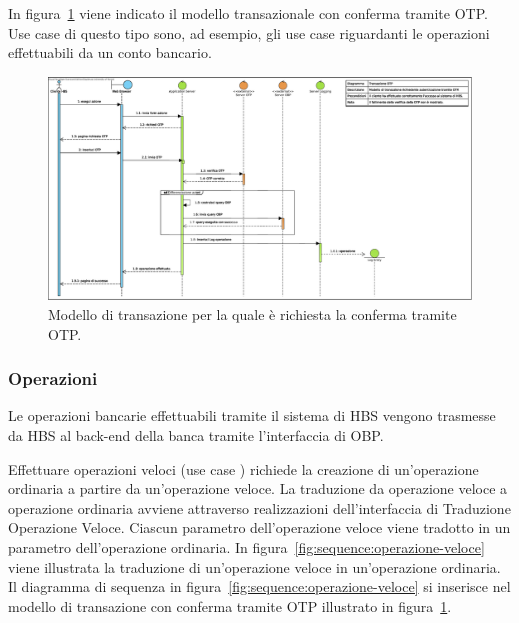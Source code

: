 In figura~\ref{fig:sequence:transazione-otp:modello} viene indicato il modello transazionale con conferma tramite OTP.
Use case di questo tipo sono, ad esempio, gli use case riguardanti le operazioni effettuabili da un conto bancario.

\begin{figure}[h]
	\centering
	\includegraphics[width=\textheight, angle=90]{Images/sequence/Transazione_OTP.eps}
	\caption{Modello di transazione per la quale è richiesta la conferma tramite OTP.}
	\label{fig:sequence:transazione-otp:modello}
\end{figure}

\subsubsection{Operazioni}

Le operazioni bancarie effettuabili tramite il sistema di HBS vengono trasmesse da HBS al back-end della banca tramite l'interfaccia di OBP.

Effettuare operazioni veloci (use case \iducDISOPVEL) richiede la creazione di un'operazione ordinaria a partire da un'operazione veloce.
La traduzione da operazione veloce a operazione ordinaria avviene attraverso realizzazioni dell'interfaccia di Traduzione Operazione Veloce.
Ciascun parametro dell'operazione veloce viene tradotto in un parametro dell'operazione ordinaria.
In figura~\ref{fig:sequence:operazione-veloce} viene illustrata la traduzione di un'operazione veloce in un'operazione ordinaria.
Il diagramma di sequenza in figura~\ref{fig:sequence:operazione-veloce} si inserisce nel modello di transazione con conferma tramite OTP illustrato in figura~\ref{fig:sequence:transazione-otp:modello}.

